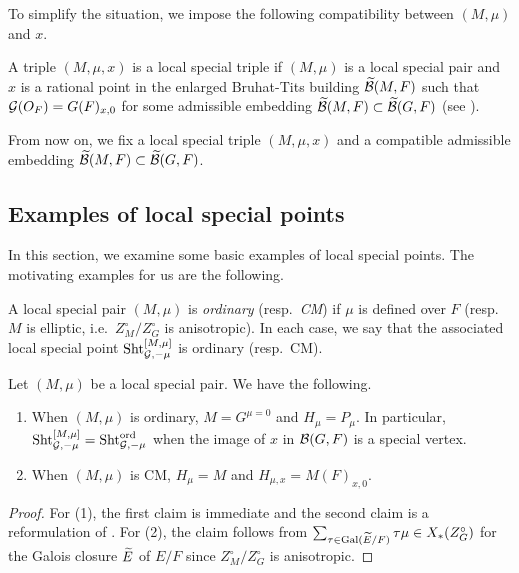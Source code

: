 \documentclass[12pt,reqno]{amsart}
\begin{document}
To simplify the situation, we impose the following compatibility between $(M, \mu)$ and $x$. 

\begin{defi} \label{defi:local_special_triple}
    A triple $(M, \mu, x)$ is a local special triple if $(M, \mu)$ is a local special pair and $x$ is a rational point in the enlarged Bruhat-Tits building ${\widetilde{{\mathcal{B}}}}(M, F)$ such that ${\mathcal{G}}(O_F) = G(F)_{x, 0}$ for some admissible embedding ${\widetilde{{\mathcal{B}}}}(M, F) \subset {\widetilde{{\mathcal{B}}}}(G, F)$ (see \cite[Section 14.2]{KP23}). 
\end{defi}

From now on, we fix a local special triple $(M, \mu, x)$ and a compatible admissible embedding ${\widetilde{{\mathcal{B}}}}(M, F) \subset {\widetilde{{\mathcal{B}}}}(G, F)$. %


\subsection{Examples of local special points} \label{ssec:example_special_points}

In this section, we examine some basic examples of local special points. The motivating examples for us are the following. 

\begin{defi} \label{defi:special_case_of_extremal_points}
    A local special pair $(M, \mu)$ is \textit{ordinary} (resp.\ \textit{CM}) if $\mu$ is defined over $F$ (resp.\ $M$ is elliptic, i.e.\ $Z_M^\circ / Z_G^\circ$ is anisotropic). In each case, we say that the associated local special point ${\operatorname{Sht}}_{{\mathcal{G}}, -\mu}^{[M, \mu]}$ is ordinary (resp.\ CM). 
\end{defi}

\begin{lem}
    Let $(M, \mu)$ be a local special pair. We have the following. 
    \begin{enumerate}
        \item When $(M, \mu)$ is ordinary, $M = G^{\mu = 0}$ and $H_\mu = P_\mu$. In particular, ${\operatorname{Sht}}_{{\mathcal{G}}, -\mu}^{[M, \mu]} = {\operatorname{Sht}}_{{\mathcal{G}}, -\mu}^{\operatorname{ord}}$ when the image of $x$ in ${\mathcal{B}}(G, F)$ is a special vertex. 
        \item When $(M, \mu)$ is CM, $H_\mu = M$ and $H_{\mu, x} = M(F)_{x, 0}$. 
    \end{enumerate}
\end{lem}
\begin{proof}
    For (1), the first claim is immediate and the second claim is a reformulation of . For (2), the claim follows from 
    $
        \sum_{\tau \in {\operatorname{Gal}}({\widetilde{E}} / F)} \tau \mu \in X_*(Z_G^\circ)
    $
    for the Galois closure ${\widetilde{E}}$ of $E / F$ since $Z_M^\circ / Z_G^\circ$ is anisotropic. 
\end{proof}
\end{document}

